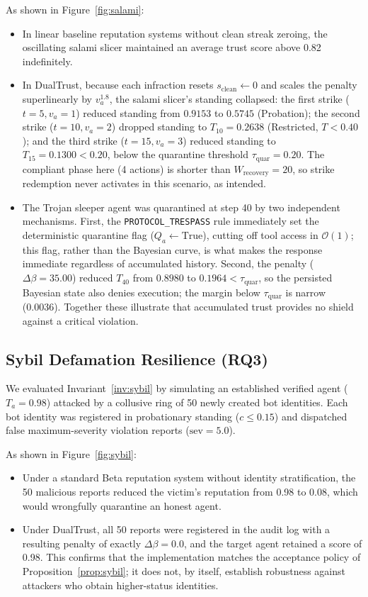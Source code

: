 \documentclass[manuscript, screen, review]{jair}
\begin{document}
As shown in Figure~\ref{fig:salami}:
\begin{itemize}[leftmargin=12pt, topsep=2pt, itemsep=1pt]
\item In linear baseline reputation systems without clean streak zeroing, the oscillating salami slicer maintained an average trust score above 0.82 indefinitely.
\item In DualTrust, because each infraction resets $s_{\text{clean}} \leftarrow 0$ and scales the penalty superlinearly by $v_a^{1.8}$, the salami slicer's standing collapsed: the first strike ($t = 5, v_a = 1$) reduced standing from $0.9153$ to $0.5745$ (Probation); the second strike ($t = 10, v_a = 2$) dropped standing to $T_{10} = 0.2638$ (Restricted, $T < 0.40$); and the third strike ($t = 15, v_a = 3$) reduced standing to $T_{15} = 0.1300 < 0.20$, below the quarantine threshold $\tau_{\text{quar}} = 0.20$. The compliant phase here (4 actions) is shorter than $W_{\text{recovery}} = 20$, so strike redemption never activates in this scenario, as intended.
\item The Trojan sleeper agent was quarantined at step 40 by two independent mechanisms. First, the \texttt{PROTOCOL\_TRESPASS} rule immediately set the deterministic quarantine flag ($Q_a \leftarrow \text{True}$), cutting off tool access in $\mathcal{O}(1)$; this flag, rather than the Bayesian curve, is what makes the response immediate regardless of accumulated history. Second, the penalty ($\Delta\beta = 35.00$) reduced $T_{40}$ from $0.8980$ to $0.1964 < \tau_{\text{quar}}$, so the persisted Bayesian state also denies execution; the margin below $\tau_{\text{quar}}$ is narrow (0.0036). Together these illustrate that accumulated trust provides no shield against a critical violation.
\end{itemize}

\subsection{Sybil Defamation Resilience (RQ3)}
We evaluated Invariant~\ref{inv:sybil} by simulating an established verified agent ($T_a = 0.98$) attacked by a collusive ring of 50 newly created bot identities. Each bot identity was registered in probationary standing ($c \le 0.15$) and dispatched false maximum-severity violation reports ($\text{sev} = 5.0$).

As shown in Figure~\ref{fig:sybil}:
\begin{itemize}[leftmargin=12pt, topsep=2pt, itemsep=1pt]
\item Under a standard Beta reputation system without identity stratification, the 50 malicious reports reduced the victim's reputation from 0.98 to 0.08, which would wrongfully quarantine an honest agent.
\item Under DualTrust, all 50 reports were registered in the audit log with a resulting penalty of exactly $\Delta\beta = 0.0$, and the target agent retained a score of 0.98. This confirms that the implementation matches the acceptance policy of Proposition~\ref{prop:sybil}; it does not, by itself, establish robustness against attackers who obtain higher-status identities.
\end{itemize}
\end{document}
